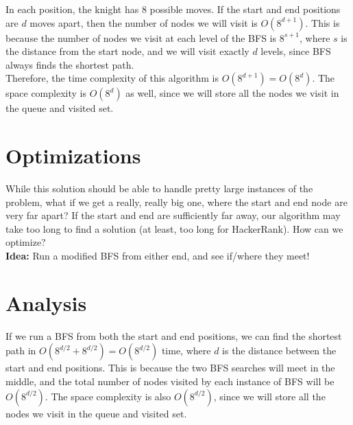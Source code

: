 \documentclass[11pt]{exam}
\begin{document}
In each position, the knight has 8 possible moves. If the start and end positions are $d$ moves apart, then the number of nodes we will visit is $O(8^{d+1})$. This is because the number of nodes we visit at each level of the BFS is $8^{s+1}$, where $s$ is the distance from the start node, and we will visit exactly $d$ levels, since BFS always finds the shortest path.\\

Therefore, the time complexity of this algorithm is $O(8^{d+1})=O(8^d)$. The space complexity is $O(8^d)$ as well, since we will store all the nodes we visit in the queue and visited set.\\
\section*{Optimizations}
While this solution should be able to handle pretty large instances of the problem, what if we get a really, really big one, where the start and end node are very far apart? If the start and end are sufficiently far away, our algorithm may take too long to find a solution (at least, too long for HackerRank). How can we optimize?\\
\textbf{Idea:} Run a modified BFS from either end, and see if/where they meet!
\section*{Analysis}
If we run a BFS from both the start and end positions, we can find the shortest path in $O(8^{d/2}+8^{d/2})=O(8^{d/2})$ time, where $d$ is the distance between the start and end positions. This is because the two BFS searches will meet in the middle, and the total number of nodes visited by each instance of BFS will be $O(8^{d/2})$. The space complexity is also $O(8^{d/2})$, since we will store all the nodes we visit in the queue and visited set.\\
\end{document}
